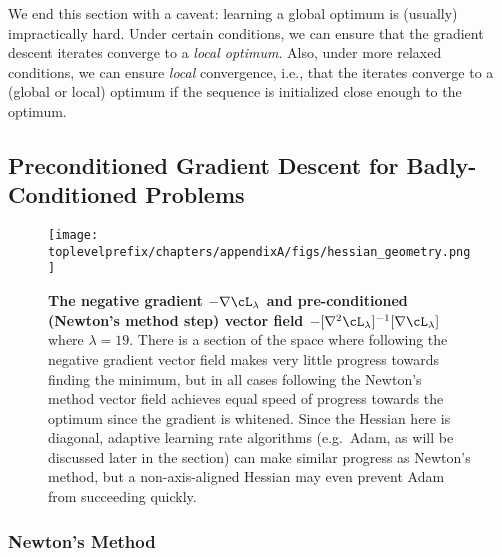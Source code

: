 \documentclass[../../book-main.tex]{subfiles}
\begin{document}
We end this section with a caveat: learning a global optimum is (usually) impractically hard. Under certain conditions, we can ensure that the gradient descent iterates converge to a \textit{local optimum}. Also, under more relaxed conditions, we can ensure \textit{local} convergence, i.e., that the iterates converge to a (global or local) optimum if the sequence is initialized close enough to the optimum.


\subsection{Preconditioned Gradient Descent for Badly-Conditioned Problems}


\begin{figure}
    \texttt{[image: \\toplevelprefix/chapters/appendixA/figs/hessian\_geometry.png]}
    \caption{\small\textbf{The negative gradient \(-\nabla \cL_{\lambda}\) and pre-conditioned (Newton's method step) vector field \(-[\nabla^{2}\cL_{\lambda}]^{-1}[\nabla \cL_{\lambda}]\)} where \(\lambda = 19\). There is a section of the space where following the negative gradient vector field makes very little progress towards finding the minimum, but in all cases following the Newton's method vector field achieves equal speed of progress towards the optimum since the gradient is whitened. Since the Hessian here is diagonal, adaptive learning rate algorithms (e.g.~Adam, as will be discussed later in the section) can make similar progress as Newton's method, but a non-axis-aligned Hessian may even prevent Adam from succeeding quickly.}
    \label{fig:hessian_geometry}
\end{figure}

\subsubsection{Newton's Method}
\end{document}
